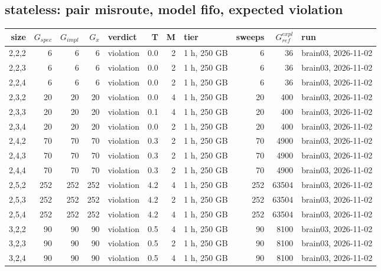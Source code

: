 \documentclass[10pt]{article}
\begin{document}
\subsection*{stateless: pair \textsf{misroute}, model fifo, expected violation}
\begin{longtable}{@{}rrrrlrrlrrl@{}}
\toprule
size & $G_{\mathit{spec}}$ & $G_{\mathit{impl}}$ & $G_x$ & verdict & T & M & tier & sweeps & $G_{\mathit{ref}}^{\mathit{expl}}$ & run \\
\midrule
\endhead
\color{blue} 2,2,2 & 6 & 6 & 6 & violation & 0.0 & 2 & 1 h, 250 GB & 6 & 36 & brain03, 2026-11-02 \\
\color{blue} 2,2,3 & 6 & 6 & 6 & violation & 0.0 & 2 & 1 h, 250 GB & 6 & 36 & brain03, 2026-11-02 \\
\color{blue} 2,2,4 & 6 & 6 & 6 & violation & 0.0 & 2 & 1 h, 250 GB & 6 & 36 & brain03, 2026-11-02 \\
\color{blue} 2,3,2 & 20 & 20 & 20 & violation & 0.0 & 4 & 1 h, 250 GB & 20 & 400 & brain03, 2026-11-02 \\
\color{blue} 2,3,3 & 20 & 20 & 20 & violation & 0.1 & 4 & 1 h, 250 GB & 20 & 400 & brain03, 2026-11-02 \\
\color{blue} 2,3,4 & 20 & 20 & 20 & violation & 0.0 & 2 & 1 h, 250 GB & 20 & 400 & brain03, 2026-11-02 \\
\color{blue} 2,4,2 & 70 & 70 & 70 & violation & 0.3 & 2 & 1 h, 250 GB & 70 & 4900 & brain03, 2026-11-02 \\
\color{blue} 2,4,3 & 70 & 70 & 70 & violation & 0.3 & 2 & 1 h, 250 GB & 70 & 4900 & brain03, 2026-11-02 \\
\color{blue} 2,4,4 & 70 & 70 & 70 & violation & 0.3 & 2 & 1 h, 250 GB & 70 & 4900 & brain03, 2026-11-02 \\
\color{blue} 2,5,2 & 252 & 252 & 252 & violation & 4.2 & 4 & 1 h, 250 GB & 252 & 63504 & brain03, 2026-11-02 \\
\color{blue} 2,5,3 & 252 & 252 & 252 & violation & 4.2 & 2 & 1 h, 250 GB & 252 & 63504 & brain03, 2026-11-02 \\
\color{blue} 2,5,4 & 252 & 252 & 252 & violation & 4.2 & 4 & 1 h, 250 GB & 252 & 63504 & brain03, 2026-11-02 \\
\color{blue} 3,2,2 & 90 & 90 & 90 & violation & 0.5 & 4 & 1 h, 250 GB & 90 & 8100 & brain03, 2026-11-02 \\
\color{blue} 3,2,3 & 90 & 90 & 90 & violation & 0.5 & 2 & 1 h, 250 GB & 90 & 8100 & brain03, 2026-11-02 \\
\color{blue} 3,2,4 & 90 & 90 & 90 & violation & 0.5 & 4 & 1 h, 250 GB & 90 & 8100 & brain03, 2026-11-02 \\

\end{longtable}
\end{document}

